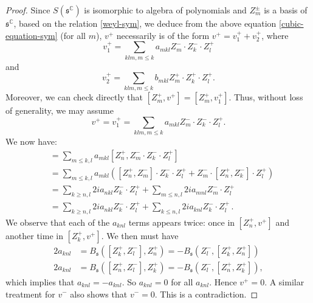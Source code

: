 \documentclass[10pt,a4paper]{amsart}
\newcommand{\ms}{\mathfrak{s}}
\begin{document}
\begin{proof}
Since $S(\ms^\mathbb{C})$  is isomorphic to algebra of polynomials and $Z_m^\pm$ is a basis of 
$\ms^\mathbb{C}$,  based on the relation \eqref{weyl-sym}, 
we deduce from the above equation \eqref{cubic-equation-sym} (for all $m$), $v^+$  necessarily is of  the form $v^+=v_1^+ +v_2^+$, 
where  
$$v_1^+ = \sum_{klm,m\leq k}a_{mkl} Z_m^-\cdot Z_k^-\cdot Z_l^+$$  and 
$$v_2^+ = \sum_{klm,m\leq k}b_{mkl} Z_m^+ \cdot Z_k^+\cdot Z_l^+.$$
Moreover, we can check directly that $[Z_m^+,v^+] =[Z_m^+, v_1^+]$. Thus, without loss of generality, we may assume 
$$v^+=v_1^+ = \sum_{klm,m\leq k}a_{mkl} Z_m^-\cdot Z_k^-\cdot Z_l^+.$$
We now have:
\begin{align*}
    [Z_n^+,v^+]
    &= \sum_{m\leq k,l}a_{mkl} [Z_n^+,Z_m^-\cdot Z_k^-\cdot Z_l^+] \\
    &= \sum_{m\leq k,l}a_{mkl} \left(
        [Z_n^+,Z_m^-]\cdot Z_k^-\cdot Z_l^+
        +Z_m^-\cdot [Z_n^+,Z_k^-]\cdot Z_l^+ \right)\\
    &= \sum_{k\geq n,l} 2ia_{nkl}Z_k^-\cdot Z_l^+ 
        + \sum_{m\leq n, l} 2ia_{mnl} Z_m^-\cdot Z_l^+ \\
    &= \sum_{k\geq n,l} 2ia_{nkl}Z_k^-\cdot Z_l^+      +\sum_{k\leq n,l} 2ia_{knl}Z_k^-\cdot Z_l^+\,.
\end{align*}
We observe that each of the $a_{knl}$ terms appears twice: 
once in $[Z_n^+,v^+]$ and another time 
in $[Z_k^+,v^+]$. We then must have
\begin{align*}
     2a_{knl} &= B_\ms([Z_k^+,Z_l^-],Z_n^+)
    =-B_\ms(Z_l^-,[Z_k^+,Z_n^+]) \\
    2a_{knl} &=
    B_\ms([Z_n^+,Z_l^-],Z_k^+)
    =-B_\ms(Z_l^-,[Z_n^+,Z_k^+]),
\end{align*}
which implies that $a_{knl}=-a_{knl}$. So $a_{knl}=0$ for all $a_{knl}$. Hence $v^+=0$. A similar treatment for $v^-$ also shows  that $v^-=0$. This is a contradiction.
\end{proof}
\end{document}
